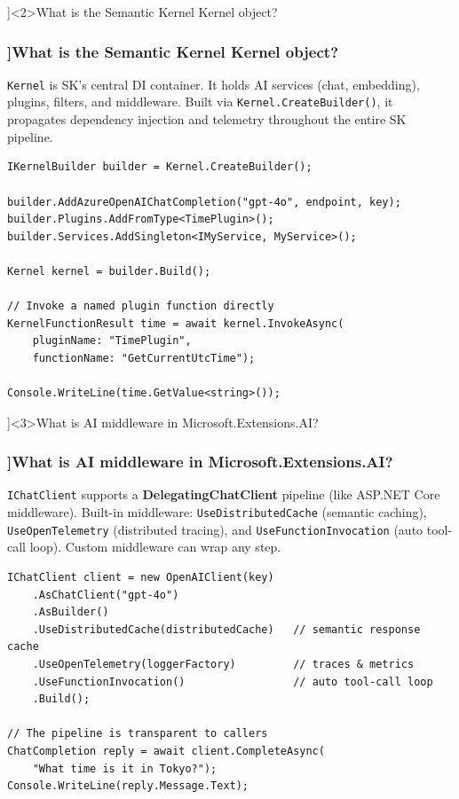 \QuestionSlide[\CategoryBadge[AIColor!20]{AI \& .NET}]<2>{What is the Semantic Kernel Kernel object?}

\begin{frame}[fragile]
  \frametitle{\AnswerTitle[\CategoryBadge[AIColor!20]{AI \& .NET}]{What is the Semantic Kernel Kernel object?}}

  {\footnotesize
  \texttt{Kernel} is SK's central DI container. It holds AI services (chat, embedding), plugins, filters,
  and middleware. Built via \texttt{Kernel.CreateBuilder()}, it propagates dependency injection and
  telemetry throughout the entire SK pipeline.
  }

  \begin{verbatim}
IKernelBuilder builder = Kernel.CreateBuilder();

builder.AddAzureOpenAIChatCompletion("gpt-4o", endpoint, key);
builder.Plugins.AddFromType<TimePlugin>();
builder.Services.AddSingleton<IMyService, MyService>();

Kernel kernel = builder.Build();

// Invoke a named plugin function directly
KernelFunctionResult time = await kernel.InvokeAsync(
    pluginName: "TimePlugin",
    functionName: "GetCurrentUtcTime");

Console.WriteLine(time.GetValue<string>());
  \end{verbatim}
\end{frame}

\QuestionSlide[\CategoryBadge[AIColor!20]{AI \& .NET}]<3>{What is AI middleware in Microsoft.Extensions.AI?}

\begin{frame}[fragile]
  \frametitle{\AnswerTitle[\CategoryBadge[AIColor!20]{AI \& .NET}]{What is AI middleware in Microsoft.Extensions.AI?}}

  {\footnotesize
  \texttt{IChatClient} supports a \textbf{DelegatingChatClient} pipeline (like ASP.NET Core middleware).
  Built-in middleware: \texttt{UseDistributedCache} (semantic caching), \texttt{UseOpenTelemetry}
  (distributed tracing), and \texttt{UseFunctionInvocation} (auto tool-call loop).
  Custom middleware can wrap any step.
  }

  \begin{verbatim}
IChatClient client = new OpenAIClient(key)
    .AsChatClient("gpt-4o")
    .AsBuilder()
    .UseDistributedCache(distributedCache)   // semantic response cache
    .UseOpenTelemetry(loggerFactory)         // traces & metrics
    .UseFunctionInvocation()                 // auto tool-call loop
    .Build();

// The pipeline is transparent to callers
ChatCompletion reply = await client.CompleteAsync(
    "What time is it in Tokyo?");
Console.WriteLine(reply.Message.Text);
  \end{verbatim}
\end{frame}
